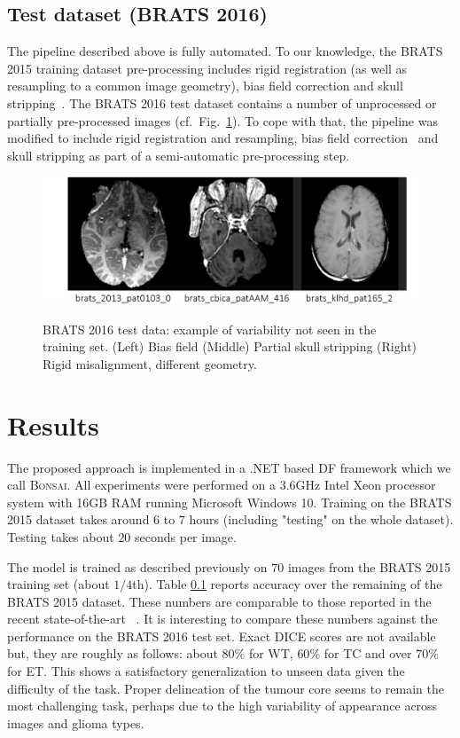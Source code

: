 \subsection{Test dataset (BRATS 2016)}

The pipeline described above is fully automated. To our knowledge, the BRATS 2015 training dataset pre-processing includes rigid registration (as well as resampling to a common image geometry), bias field correction and skull stripping~\cite{menze2015multimodal}. The BRATS 2016 test dataset contains a number of unprocessed or partially pre-processed images (cf.~Fig.~\ref{fig: test data}). To cope with that, the pipeline was modified to include rigid registration and resampling, bias field correction~\cite{tustison2009n4itk} and skull stripping as part of a semi-automatic pre-processing step.

\begin{figure}
\centering
\includegraphics[width=1\textwidth]{images/BRATS2016_example-data.png}
\label{fig: test data}
\caption{BRATS 2016 test data: example of variability not seen in the training set. (Left) Bias field (Middle) Partial skull stripping (Right) Rigid misalignment, different geometry.}
\end{figure}

\section{Results}
\label{sec: results}

The proposed approach is implemented in a .NET based DF framework which we call \textsc{Bonsai}. All experiments were performed on a 3.6GHz Intel Xeon processor 
system with 16GB RAM running Microsoft Windows 10. Training on the BRATS 2015 dataset takes 
around $6$ to $7$ hours (including "testing" on the whole dataset). Testing takes about $20$ seconds per image.

The model is trained as described previously on $70$ images from the BRATS 2015 training set (about $1/4$th). Table \ref{} reports accuracy over the remaining of the BRATS 2015 dataset. These numbers are comparable to those reported in the recent state-of-the-art \eg~\cite{kamnitsas2016efficient}. It is interesting to compare these numbers against the performance on the BRATS 2016 test set. Exact DICE scores are not available but, they are roughly as follows: about $80\%$ for WT, $60\%$ for TC and over $70\%$ for ET. This shows a satisfactory generalization to unseen data given the difficulty of the task. Proper delineation of the tumour core seems to remain the most challenging task, perhaps due to the high variability of appearance across images and glioma types.
